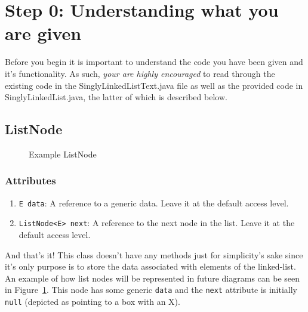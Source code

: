 
\section{Step 0: Understanding what you are given}

Before you begin it is important to understand the code you have been given and it's functionality. 
As such, \textit{your are highly encouraged} to read through the existing code in the SinglyLinkedListText.java
file as well as the provided code in SinglyLinkedList.java, the latter of which is described below.

\subsection{ListNode}

\begin{figure}[H]
    \centering
    \caption{Example ListNode}
    \label{fig:listnode}
\end{figure}


\subsubsection{Attributes}

\begin{enumerate}
    \item \lstinline|E data|: A reference to a generic data. Leave it at the default access level.
    \item \lstinline|ListNode<E> next|: A reference to the next node in the list. Leave it at the default access level.
\end{enumerate}

And that's it! This class doesn't have any methods just for simplicity's sake
since it's only purpose is to store the data associated with elements of the
linked-list.  An example of how list nodes will be represented in future
diagrams can be seen in Figure~\ref{fig:listnode}. This node has some generic
\lstinline|data| and the \lstinline|next| attribute is initially
\lstinline|null| (depicted as pointing to a box with an X). 

